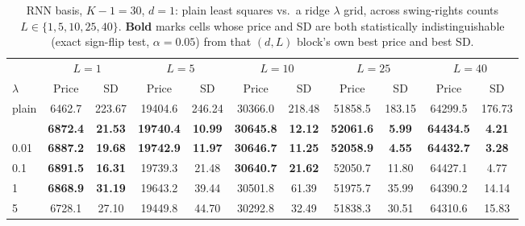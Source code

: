 \begin{table}[htbp]
\caption{\label{tab:rnn_ridge_lambda_L_sweep_K30_d1}RNN basis, $K-1=30$, $d=1$: plain least squares vs.\ a ridge $\lambda$ grid, across swing-rights counts $L \in \{1,5,10,25,40\}$. \textbf{Bold} marks cells whose price and SD are both statistically indistinguishable (exact sign-flip test, $\alpha=0.05$) from that $(d,L)$ block's own best price and best SD.}
\scriptsize
\setlength{\tabcolsep}{3pt}
\centering
\begin{tabular}[t]{lcccccccccc}
\toprule
\multicolumn{1}{c}{ } & \multicolumn{2}{c}{$L = 1$} & \multicolumn{2}{c}{$L = 5$} & \multicolumn{2}{c}{$L = 10$} & \multicolumn{2}{c}{$L = 25$} & \multicolumn{2}{c}{$L = 40$} \\
\cmidrule(l{3pt}r{3pt}){2-3} \cmidrule(l{3pt}r{3pt}){4-5} \cmidrule(l{3pt}r{3pt}){6-7} \cmidrule(l{3pt}r{3pt}){8-9} \cmidrule(l{3pt}r{3pt}){10-11}
$\lambda$ & Price & SD & Price & SD & Price & SD & Price & SD & Price & SD\\
\midrule
plain & 6462.7 & 223.67 & 19404.6 & 246.24 & 30366.0 & 218.48 & 51858.5 & 183.15 & 64299.5 & 176.73\\
\addlinespace
0.001 & \textbf{6872.4} & \textbf{21.53} & \textbf{19740.4} & \textbf{10.99} & \textbf{30645.8} & \textbf{12.12} & \textbf{52061.6} & \textbf{5.99} & \textbf{64434.5} & \textbf{4.21}\\
0.01 & \textbf{6887.2} & \textbf{19.68} & \textbf{19742.9} & \textbf{11.97} & \textbf{30646.7} & \textbf{11.25} & \textbf{52058.9} & \textbf{4.55} & \textbf{64432.7} & \textbf{3.28}\\
0.1 & \textbf{6891.5} & \textbf{16.31} & 19739.3 & 21.48 & \textbf{30640.7} & \textbf{21.62} & 52050.7 & 11.80 & 64427.1 & 4.77\\
1 & \textbf{6868.9} & \textbf{31.19} & 19643.2 & 39.44 & 30501.8 & 61.39 & 51975.7 & 35.99 & 64390.2 & 14.14\\
5 & 6728.1 & 27.10 & 19449.8 & 44.70 & 30292.8 & 32.49 & 51838.3 & 30.51 & 64310.6 & 15.83\\
\bottomrule
\end{tabular}
\end{table}

